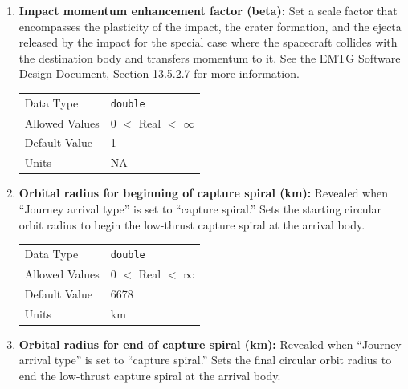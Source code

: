 \begin{enumerate}
    \item \textbf{Impact momentum enhancement factor (beta):} Set a scale factor that encompasses the plasticity of the impact, the crater formation, and the ejecta released by the impact for the special case where the spacecraft collides with the destination body and transfers momentum to it. See the \ac{EMTG} Software Design Document, Section 13.5.2.7 for more information.
        
        \begin{table}[H]
            \hspace{2cm}
            \begin{tabular}{ll}
            Data Type & \verb|double| \\
            Allowed Values & 0 $<$ Real $<$ $\infty$ \\
            Default Value & 1 \\
            Units & NA 
            \end{tabular}
        \end{table}


    \item \textbf{Orbital radius for beginning of capture spiral (km):} Revealed when ``Journey arrival type'' is set to ``capture spiral.'' Sets the starting circular orbit radius to begin the low-thrust capture spiral at the arrival body.
    
        \begin{table}[H]
            \hspace{2cm}
            \begin{tabular}{ll}
            Data Type & \verb|double| \\
            Allowed Values & 0 $<$ Real $<$ $\infty$ \\
            Default Value & 6678\\
            Units & km
            \end{tabular}
        \end{table}

    \item \textbf{Orbital radius for end of capture spiral (km):} Revealed when ``Journey arrival type'' is set to ``capture spiral.'' Sets the final circular orbit radius to end the low-thrust capture spiral at the arrival body.
    

\end{enumerate}
